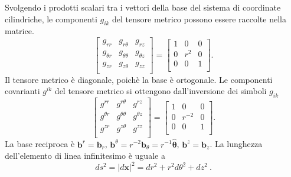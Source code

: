 \begin{example}
 Svolgendo i prodotti scalari tra i vettori della base del sistema di coordinate cilindriche, le componenti $g_{ik}$ del tensore metrico possono essere raccolte nella matrice.
\begin{equation}
 \begin{bmatrix} g_{rr} & g_{r\theta} & g_{rz} \\
 g_{\theta r} & g_{\theta \theta} & g_{\theta z} \\
 g_{z r} & g_{z \theta} & g_{zz} \\ \end{bmatrix} = 
 \begin{bmatrix} 1 & 0 & 0 \\ 0 & r^2 & 0 \\ 0 & 0 & 1  \\ \end{bmatrix} .
\end{equation}
 Il tensore metrico è diagonale, poichè la base è ortogonale. Le componenti covarianti $g^{ik}$ del tensore metrico si ottengono dall'inversione dei simboli $g_{ik}$
\begin{equation}
 \begin{bmatrix} g^{rr} & g^{r\theta} & g^{rz} \\
 g^{\theta r} & g^{\theta \theta} & g^{\theta z} \\
 g^{z r} & g^{z \theta} & g^{zz} \\ \end{bmatrix} = 
 \begin{bmatrix} 1 & 0 & 0 \\ 0 & r^{-2} & 0 \\ 0 & 0 & 1  \\ \end{bmatrix} .
\end{equation}
La base reciproca è $\bm{b}^r = \bm{b}_r$, $\bm{b}^{\theta} = r^{-2} \bm{b}_{\theta} = r^{-1} \bm{\hat{\theta}}$, $\bm{b}^z = \bm{b}_z$.
 La lunghezza dell'elemento di linea infinitesimo è uguale a
\begin{equation}
    ds^2 = |d\bm{x}|^2 = dr^2 + r^2 d\theta^2 + dz^2 \ .
\end{equation}
\end{example}


 
